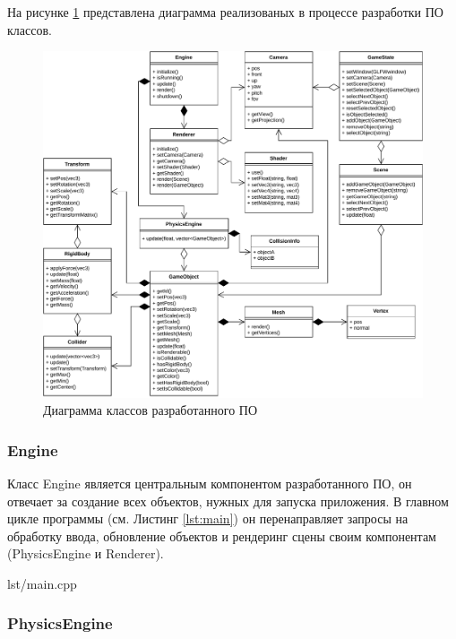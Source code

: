 На рисунке \ref{fig:uml} представлена диаграмма реализованых в процессе разработки ПО классов.

\begin{figure}[H]
	\centering
	\includegraphics[width=\textwidth]{diag/uml.pdf}
	\caption{Диаграмма классов разработанного ПО}
	\label{fig:uml}
\end{figure}

\subsubsection*{Engine}

Класс Engine является центральным компонентом разработанного ПО, он отвечает за создание всех объектов, нужных для запуска приложения.
В главном цикле программы (см. Листинг \ref{lst:main}) он перенаправляет запросы на обработку ввода, обновление объектов и рендеринг сцены своим компонентам (PhysicsEngine и Renderer).

\begin{code}
    \begin{lstinputlisting}[
            label={lst:main},
            caption={Точка входа и главный цикл},
        ]{lst/main.cpp}
    \end{lstinputlisting}
\end{code}

\subsubsection*{PhysicsEngine}


